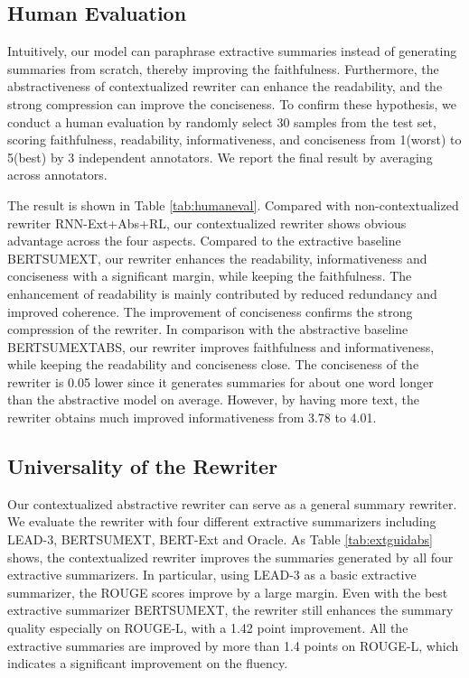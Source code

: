 \documentclass[letterpaper]{article} %
\begin{document}
\subsection{Human Evaluation}
Intuitively, our model can paraphrase extractive summaries instead of generating summaries from scratch, thereby improving the faithfulness. Furthermore, the abstractiveness of contextualized rewriter can enhance the readability, and the strong compression can improve the conciseness. To confirm these hypothesis, we conduct a human evaluation by randomly select 30 samples from the test set, scoring faithfulness, readability, informativeness, and conciseness from 1(worst) to 5(best) by 3 independent annotators. We report the final result by averaging across annotators.

The result is shown in Table \ref{tab:humaneval}. Compared with non-contextualized rewriter RNN-Ext+Abs+RL, our contextualized rewriter shows obvious advantage across the four aspects. Compared to the extractive baseline BERTSUMEXT, our rewriter enhances the readability, informativeness and conciseness with a significant margin, while keeping the faithfulness. The enhancement of readability is mainly contributed by reduced redundancy and improved coherence. The improvement of conciseness confirms the strong compression of the rewriter. In comparison with the abstractive baseline BERTSUMEXTABS, our rewriter improves faithfulness and informativeness, while keeping the readability and conciseness close. The conciseness of the rewriter is 0.05 lower since it generates summaries for about one word longer than the abstractive model on average. However, by having more text, the rewriter obtains much improved informativeness from 3.78 to 4.01.


\subsection{Universality of the Rewriter}
Our contextualized abstractive rewriter can serve as a general summary rewriter. We evaluate the rewriter with four different extractive summarizers including LEAD-3, BERTSUMEXT, BERT-Ext and Oracle. As Table \ref{tab:extguidabs} shows, the contextualized rewriter improves the summaries generated by all four extractive summarizers. In particular, using LEAD-3 as a basic extractive summarizer, the ROUGE scores improve by a large margin. Even with the best extractive summarizer BERTSUMEXT, the rewriter still enhances the summary quality especially on ROUGE-L, with a 1.42 point improvement. All the extractive summaries are improved by more than 1.4 points on ROUGE-L, which indicates a significant improvement on the fluency. 
\end{document}
